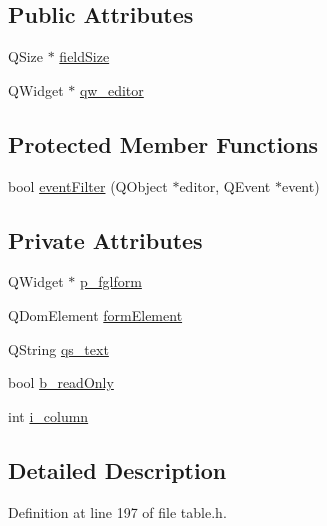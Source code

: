 \subsection*{Public Attributes}
\begin{DoxyCompactItemize}
\item 
QSize $\ast$ \hyperlink{classLineEditDelegate_ace648742ec01e245e35b39261383ae89}{fieldSize}
\item 
QWidget $\ast$ \hyperlink{classLineEditDelegate_a16d00d8e62e3c89978d07adcffa007c9}{qw\_\-editor}
\end{DoxyCompactItemize}
\subsection*{Protected Member Functions}
\begin{DoxyCompactItemize}
\item 
bool \hyperlink{classLineEditDelegate_acc5efdbc01898262cc1050dc696aad6a}{eventFilter} (QObject $\ast$editor, QEvent $\ast$event)
\end{DoxyCompactItemize}
\subsection*{Private Attributes}
\begin{DoxyCompactItemize}
\item 
QWidget $\ast$ \hyperlink{classLineEditDelegate_a2f504917f4de35dd8f400d8d696bdc1d}{p\_\-fglform}
\item 
QDomElement \hyperlink{classLineEditDelegate_aa635e6dd4afb8971b6d85db420c16773}{formElement}
\item 
QString \hyperlink{classLineEditDelegate_ad734b27bd24f9eebab7dc0b0a70897a7}{qs\_\-text}
\item 
bool \hyperlink{classLineEditDelegate_ae056ae674734bac2b666e31071568fbd}{b\_\-readOnly}
\item 
int \hyperlink{classLineEditDelegate_a8484d34acb269d70d28e3ccaa98c8a49}{i\_\-column}
\end{DoxyCompactItemize}


\subsection{Detailed Description}


Definition at line 197 of file table.h.




